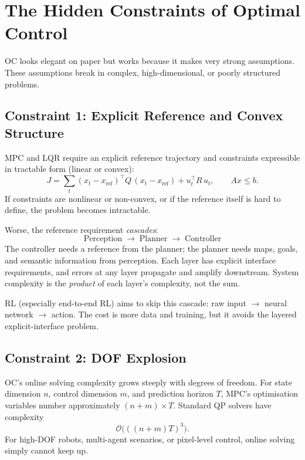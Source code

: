 \section{The Hidden Constraints of Optimal Control}
\label{sec:oc-constraints}

OC looks elegant on paper but works because it makes very strong assumptions.
These assumptions break in complex, high-dimensional, or poorly structured problems.

\subsection{Constraint 1: Explicit Reference and Convex Structure}

MPC and LQR require an explicit reference trajectory and constraints expressible in tractable form (linear or convex):
\[
  J = \sum_{t} (x_t - x_{\text{ref}})^\top Q\,(x_t - x_{\text{ref}}) + u_t^\top R\, u_t,
  \qquad A x \le b.
\]
If constraints are nonlinear or non-convex, or if the reference itself is hard to define, the problem becomes intractable.

Worse, the reference requirement \emph{cascades}:
\[
  \text{Perception} \;\longrightarrow\; \text{Planner} \;\longrightarrow\; \text{Controller}
\]
The controller needs a reference from the planner; the planner needs maps, goals, and semantic information from perception.
Each layer has explicit interface requirements, and errors at any layer propagate and amplify downstream.
System complexity is the \emph{product} of each layer's complexity, not the sum.

RL (especially end-to-end RL) aims to skip this cascade:
raw input $\longrightarrow$ neural network $\longrightarrow$ action.
The cost is more data and training, but it avoids the layered explicit-interface problem.

\subsection{Constraint 2: DOF Explosion}

OC's online solving complexity grows steeply with degrees of freedom.
For state dimension $n$, control dimension $m$, and prediction horizon $T$, MPC's optimisation variables number approximately $(n+m)\times T$.
Standard QP solvers have complexity
\[
  \mathcal{O}\!\bigl(((n+m)T)^3\bigr).
\]
For high-DOF robots, multi-agent scenarios, or pixel-level control, online solving simply cannot keep up.

